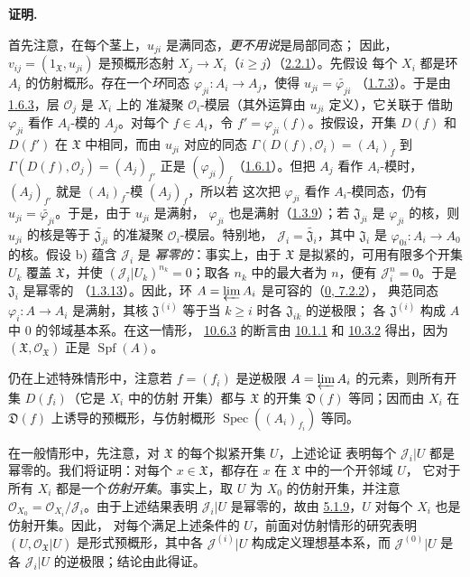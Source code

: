 \documentclass[UTF8,fontset=none,11pt,oneside,openany]{ctexbook}
\newenvironment{proof}{%
  \par\medskip\noindent\textbf{证明.}\ %
}{\par}
\begin{document}
\begin{proof}
首先注意，在每个茎上，$u_{ji}$ 是满同态，\emph{更不用说}是局部同态；
因此，$v_{ij}=(1_{\mathfrak{X}},u_{ji})$ 是预概形态射
$X_j\to X_i$（$i\geq j$）（\hyperref[I.2.2.1-fr]{2.2.1}）。先假设
每个 $X_i$ 都是环 $A_i$ 的仿射概形。存在一个\emph{环}同态
$\varphi_{ji}:A_i\to A_j$，使得
$u_{ji}=\widetilde{\varphi_{ji}}$
（\hyperref[I.1.7.3-fr]{1.7.3}）。于是由
\hyperref[I.1.6.3-fr]{1.6.3}，层 $\mathscr{O}_j$ 是 $X_i$ 上的
准凝聚 $\mathscr{O}_i$-模层（其外运算由 $u_{ji}$ 定义），它关联于
借助 $\varphi_{ji}$ 看作 $A_i$-模的 $A_j$。对每个 $f\in A_i$，令
$f'=\varphi_{ji}(f)$。按假设，开集 $D(f)$ 和 $D(f')$ 在
$\mathfrak{X}$ 中相同，而由 $u_{ji}$ 对应的同态
$\Gamma(D(f),\mathscr{O}_i)=(A_i)_f$ 到
$\Gamma(D(f),\mathscr{O}_j)=(A_j)_{f'}$ 正是
$(\varphi_{ji})_f$（\hyperref[I.1.6.1-fr]{1.6.1}）。但把 $A_j$
看作 $A_i$-模时，$(A_j)_{f'}$ 就是 $(A_i)_f$-模 $(A_j)_f$，所以若
这次把 $\varphi_{ji}$ 看作 $A_i$-模同态，仍有
$u_{ji}=\widetilde{\varphi_{ji}}$。于是，由于 $u_{ji}$ 是满射，
$\varphi_{ji}$ 也是满射（\hyperref[I.1.3.9-fr]{1.3.9}）；若
$\mathfrak{J}_{ji}$ 是 $\varphi_{ji}$ 的核，则 $u_{ji}$ 的核是等于
$\widetilde{\mathfrak{J}_{ji}}$ 的准凝聚 $\mathscr{O}_i$-模层。特别地，
$\mathscr{J}_i=\widetilde{\mathfrak{J}_i}$，其中 $\mathfrak{J}_i$ 是
$\varphi_{0i}:A_i\to A_0$ 的核。假设 b) 蕴含 $\mathscr{J}_i$ 是
\emph{幂零的}：事实上，由于 $\mathfrak{X}$ 是拟紧的，可用有限多个开集
$U_k$ 覆盖 $\mathfrak{X}$，并使
$(\mathscr{J}_i|U_k)^{n_k}=0$；取各 $n_k$ 中的最大者为 $n$，便有
$\mathscr{J}_i^n=0$。于是 $\mathfrak{J}_i$ 是幂零的
（\hyperref[I.1.3.13-fr]{1.3.13}）。因此，环
$A=\varprojlim A_i$ 是可容的（\hyperref[0.7.2.2-fr]{0, 7.2.2}），
典范同态 $\varphi_i:A\to A_i$ 是满射，其核
$\mathfrak{J}^{(i)}$ 等于当 $k\geq i$ 时各 $\mathfrak{J}_{ik}$ 的逆极限；
各 $\mathfrak{J}^{(i)}$ 构成 $A$ 中 0 的邻域基本系。在这一情形，
\hyperref[I.10.6.3-fr]{10.6.3} 的断言由
\hyperref[I.10.1.1-fr]{10.1.1} 和
\hyperref[I.10.3.2-fr]{10.3.2} 得出，因为
$(\mathfrak{X},\mathscr{O}_{\mathfrak{X}})$ 正是
$\operatorname{Spf}(A)$。

仍在上述特殊情形中，注意若 $f=(f_i)$ 是逆极限
$A=\varprojlim A_i$ 的元素，则所有开集 $D(f_i)$（它是 $X_i$ 中的仿射
开集）都与 $\mathfrak{X}$ 的开集 $\mathfrak{D}(f)$ 等同；因而由
$X_i$ 在 $\mathfrak{D}(f)$ 上诱导的预概形，与仿射概形
$\operatorname{Spec}((A_i)_{f_i})$ 等同。

在一般情形中，先注意，对 $\mathfrak{X}$ 的每个拟紧开集 $U$，上述论证
表明每个 $\mathscr{J}_i|U$ 都是幂零的。我们将证明：对每个
$x\in\mathfrak{X}$，都存在 $x$ 在 $\mathfrak{X}$ 中的一个开邻域 $U$，
它对于所有 $X_i$ 都是一个\emph{仿射开集}。事实上，取 $U$ 为
$X_0$ 的仿射开集，并注意
$\mathscr{O}_{X_0}=\mathscr{O}_{X_i}/\mathscr{J}_i$。由于上述结果表明
$\mathscr{J}_i|U$ 是幂零的，故由
\hyperref[I.5.1.9-fr]{5.1.9}，$U$ 对每个 $X_i$ 也是仿射开集。因此，
对每个满足上述条件的 $U$，前面对仿射情形的研究表明
$(U,\mathscr{O}_{\mathfrak{X}}|U)$ 是形式预概形，其中各
$\mathscr{J}^{(i)}|U$ 构成定义理想基本系，而
$\mathscr{J}^{(0)}|U$ 是各 $\mathscr{J}_i|U$ 的逆极限；结论由此得证。
\end{proof}
\end{document}
